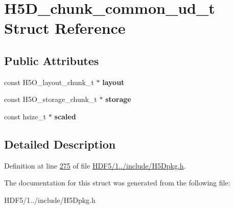 \hypertarget{struct_h5_d__chunk__common__ud__t}{}\section{H5\+D\+\_\+chunk\+\_\+common\+\_\+ud\+\_\+t Struct Reference}
\label{struct_h5_d__chunk__common__ud__t}
\subsection*{Public Attributes}
\begin{DoxyCompactItemize}
\item 
\mbox{\label{struct_h5_d__chunk__common__ud__t_a0e67c778816c5299906742d34cedd783}} 
const H5\+O\+\_\+layout\+\_\+chunk\+\_\+t $\ast$ {\bfseries layout}
\item 
\mbox{\label{struct_h5_d__chunk__common__ud__t_aeb1c257cd419cd958677013979a70b18}} 
const H5\+O\+\_\+storage\+\_\+chunk\+\_\+t $\ast$ {\bfseries storage}
\item 
\mbox{\label{struct_h5_d__chunk__common__ud__t_a859a0ce1a8d30e58ce4e6dfcc2d01538}} 
const hsize\+\_\+t $\ast$ {\bfseries scaled}
\end{DoxyCompactItemize}


\subsection{Detailed Description}


Definition at line \hyperlink{_h_d_f5_21_810_81_2include_2_h5_dpkg_8h_source_l00275}{275} of file \hyperlink{_h_d_f5_21_810_81_2include_2_h5_dpkg_8h_source}{H\+D\+F5/1../include/\+H5\+Dpkg.\+h}.



The documentation for this struct was generated from the following file\+:\begin{DoxyCompactItemize}
\item 
H\+D\+F5/1../include/\+H5\+Dpkg.\+h\end{DoxyCompactItemize}
